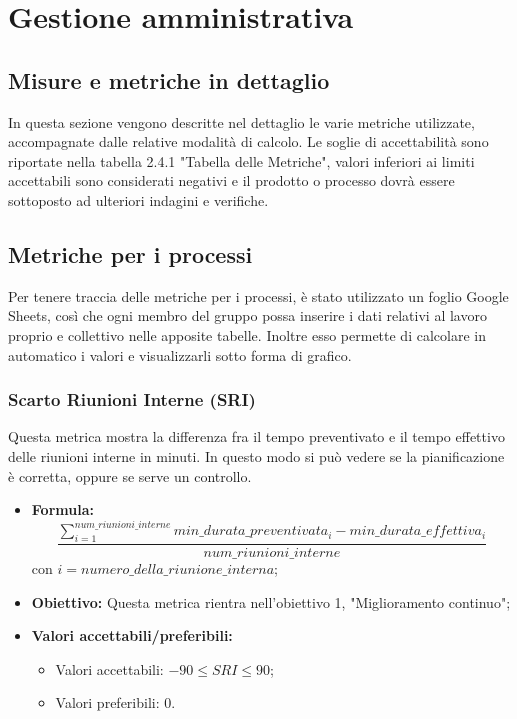 \section{Gestione amministrativa}
\subsection{Misure e metriche in dettaglio}
In questa sezione vengono descritte nel dettaglio le varie metriche utilizzate, accompagnate dalle relative modalità di calcolo.
Le soglie di accettabilità sono riportate nella tabella 2.4.1 "Tabella delle Metriche", valori inferiori ai limiti accettabili sono considerati negativi e il prodotto o processo dovrà essere sottoposto ad ulteriori indagini e verifiche.
\subsection{Metriche per i processi}
Per tenere traccia delle metriche per i processi, è stato utilizzato un foglio Google Sheets, così che ogni membro del gruppo possa inserire i dati relativi al lavoro proprio e collettivo nelle apposite tabelle. Inoltre esso permette di calcolare in automatico i valori e visualizzarli sotto forma di grafico.

\subsubsection{Scarto Riunioni Interne (SRI)}
Questa metrica mostra la differenza fra il tempo preventivato e il tempo effettivo delle riunioni interne in minuti. In questo modo si può vedere se la pianificazione è corretta, oppure se serve un controllo.
\begin{itemize}
	\item {\textbf{Formula: }}
		\[\frac{\sum_{i=1}^{num\_riunioni\_interne}min\_durata\_preventivata_i-min\_durata\_effettiva_i}{num\_riunioni\_interne}\]
		con $i = {numero\_della\_riunione\_interna}$;
	\item {\textbf{Obiettivo: }}Questa metrica rientra nell'obiettivo 1, "Miglioramento continuo";
	\item {\textbf{Valori accettabili/preferibili: }}
		\begin{itemize}
			\item Valori accettabili: $-90 \leq SRI \leq 90$;
			\item Valori preferibili: 0.
		\end{itemize}
\end{itemize}

